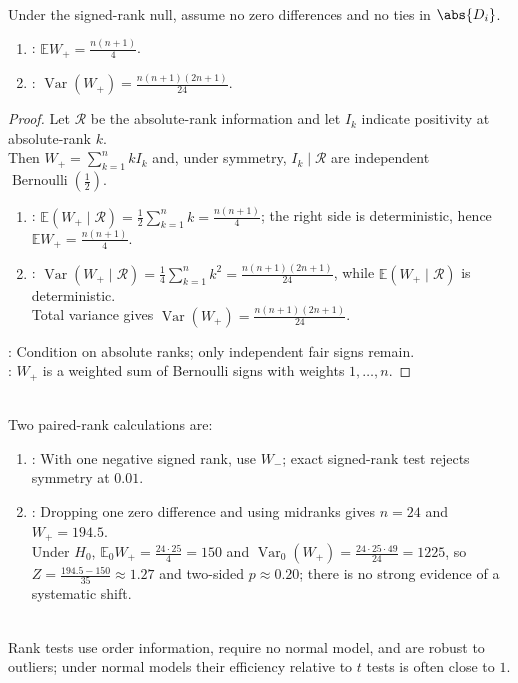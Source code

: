 \begin{theorem} \label{thm:signed-rank-mean-variance} \\
Under the signed-rank null, assume no zero differences and no ties in $\abs{D_i}$.
\begin{enumerate}[label=(\roman*)]
\setlength{\itemsep}{0pt}
\item {}: $\mathbb{E}W_+=\frac{n(n+1)}{4}$.
\item {}: $\operatorname{Var}(W_+)=\frac{n(n+1)(2n+1)}{24}$.
\end{enumerate}
\begin{proof}
Let $\mathcal{R}$ be the absolute-rank information and let $I_k$ indicate positivity at absolute-rank $k$.\\
Then $W_+=\sum\limits_{k=1}^nkI_k$ and, under symmetry, $I_k\mid\mathcal{R}$ are independent $\operatorname{Bernoulli}(\frac{1}{2})$.
\begin{enumerate}[label=(\roman*)]
\setlength{\itemsep}{0pt}
\item {}: $\mathbb{E}(W_+\mid\mathcal{R})=\frac{1}{2}\sum\limits_{k=1}^nk=\frac{n(n+1)}{4}$; the right side is deterministic, hence $\mathbb{E}W_+=\frac{n(n+1)}{4}$.
\item {}: $\operatorname{Var}(W_+\mid\mathcal{R})=\frac{1}{4}\sum\limits_{k=1}^nk^2=\frac{n(n+1)(2n+1)}{24}$, while $\mathbb{E}(W_+\mid\mathcal{R})$ is deterministic.\\
Total variance gives $\operatorname{Var}(W_+)=\frac{n(n+1)(2n+1)}{24}$.
\end{enumerate}
: Condition on absolute ranks; only independent fair signs remain.\\
: $W_+$ is a weighted sum of Bernoulli signs with weights $1,\ldots,n$.
\end{proof}
\end{theorem}

\begin{example} \label{ex:signed-rank-paired-examples} \\
Two paired-rank calculations are:
\begin{enumerate}[label=(\roman*)]
\setlength{\itemsep}{0pt}
\item {}: With one negative signed rank, use $W_-$; exact signed-rank test rejects symmetry at $0.01$.
\item {}: Dropping one zero difference and using midranks gives $n=24$ and $W_+=194.5$.\\
Under $H_0$, $\mathbb{E}_0W_+=\frac{24\cdot25}{4}=150$ and $\operatorname{Var}_0(W_+)=\frac{24\cdot25\cdot49}{24}=1225$, so $Z=\frac{194.5-150}{35}\approx1.27$ and two-sided $p\approx0.20$; there is no strong evidence of a systematic shift.
\end{enumerate}
\end{example}

\begin{remark} \label{rem:rank-tests-versus-normal-theory} \\
Rank tests use order information, require no normal model, and are robust to outliers; under normal models their efficiency relative to $t$ tests is often close to $1$.
\end{remark}
